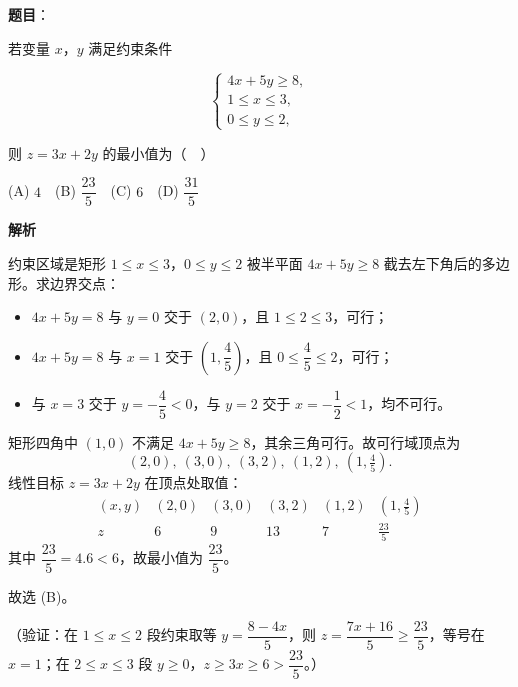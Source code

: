 \begin{answer}

\textbf{题目}：

若变量 \(x\)，\(y\) 满足约束条件

\nopagebreak[4]
\[
\begin{cases}
4x+5y\geqslant 8,\\
1\leqslant x\leqslant 3,\\
0\leqslant y\leqslant 2,
\end{cases}
\]

则 \(z=3x+2y\) 的最小值为（　）

(A) \(4\)　(B) \(\dfrac{23}{5}\)　(C) \(6\)　(D) \(\dfrac{31}{5}\)

\textbf{解析}

约束区域是矩形 \(1\leqslant x\leqslant 3\)，\(0\leqslant y\leqslant 2\) 被半平面 \(4x+5y\geqslant 8\) 截去左下角后的多边形。求边界交点：

\begin{itemize}
\item \(4x+5y=8\) 与 \(y=0\) 交于 \((2,0)\)，且 \(1\leqslant 2\leqslant 3\)，可行；
\item \(4x+5y=8\) 与 \(x=1\) 交于 \(\left(1,\dfrac{4}{5}\right)\)，且 \(0\leqslant \dfrac45\leqslant 2\)，可行；
\item 与 \(x=3\) 交于 \(y=-\dfrac45<0\)，与 \(y=2\) 交于 \(x=-\dfrac12<1\)，均不可行。
\end{itemize}

矩形四角中 \((1,0)\) 不满足 \(4x+5y\geqslant 8\)，其余三角可行。故可行域顶点为
\nopagebreak[4]
\[
(2,0),\ (3,0),\ (3,2),\ (1,2),\ \left(1,\tfrac45\right).
\]
线性目标 \(z=3x+2y\) 在顶点处取值：
\nopagebreak[4]
\[
\begin{array}{c|ccccc}
(x,y) & (2,0) & (3,0) & (3,2) & (1,2) & \left(1,\frac45\right)\\ \hline
z & 6 & 9 & 13 & 7 & \frac{23}{5}
\end{array}
\]
其中 \(\dfrac{23}{5}=4.6<6\)，故最小值为 \(\dfrac{23}{5}\)。

故选 (B)。

（验证：在 \(1\leqslant x\leqslant 2\) 段约束取等 \(y=\dfrac{8-4x}{5}\)，则 \(z=\dfrac{7x+16}{5}\geqslant\dfrac{23}{5}\)，等号在 \(x=1\)；在 \(2\leqslant x\leqslant 3\) 段 \(y\geqslant0\)，\(z\geqslant3x\geqslant6>\dfrac{23}{5}\)。）


\end{answer}

